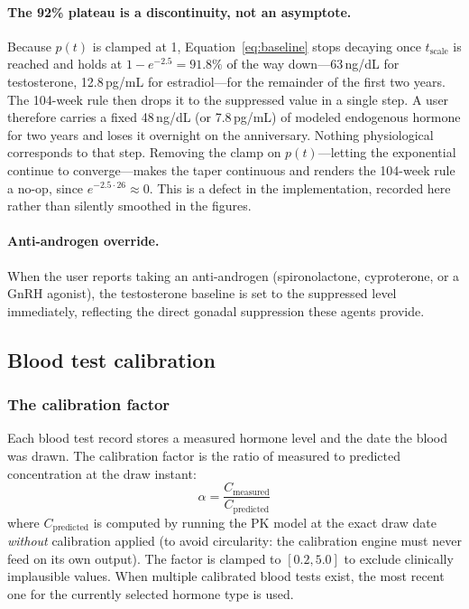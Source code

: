 \documentclass[11pt,a4paper]{article}
\begin{document}
\paragraph{The 92\% plateau is a discontinuity, not an asymptote.} Because
$p(t)$ is clamped at 1, Equation~\ref{eq:baseline} stops decaying once
$t_{\text{scale}}$ is reached and holds at $1 - e^{-2.5} = 91.8\%$ of the
way down---63\,ng/dL for testosterone, 12.8\,pg/mL for estradiol---for the
remainder of the first two years. The 104-week rule then drops it to the
suppressed value in a single step. A user therefore carries a fixed
48\,ng/dL (or 7.8\,pg/mL) of modeled endogenous hormone for two years and
loses it overnight on the anniversary. Nothing physiological corresponds to
that step. Removing the clamp on $p(t)$---letting the exponential continue
to converge---makes the taper continuous and renders the 104-week rule a
no-op, since $e^{-2.5 \cdot 26} \approx 0$. This is a defect in the
implementation, recorded here rather than silently smoothed in the figures.

\paragraph{Anti-androgen override.} When the user reports taking an
anti-androgen (spironolactone, cyproterone, or a GnRH agonist), the
testosterone baseline is set to the suppressed level immediately,
reflecting the direct gonadal suppression these agents provide.

\subsection{Blood test calibration}
\label{sec:calibration}

\subsubsection{The calibration factor}

Each blood test record stores a measured hormone level and the date the
blood was drawn. The calibration factor is the ratio of measured to
predicted concentration at the draw instant:
\begin{equation}
\alpha = \frac{C_{\text{measured}}}{C_{\text{predicted}}}
\label{eq:alpha}
\end{equation}
where $C_{\text{predicted}}$ is computed by running the PK model at the
exact draw date \emph{without} calibration applied (to avoid
circularity: the calibration engine must never feed on its own output).
The factor is clamped to $[0.2, 5.0]$ to exclude clinically implausible
values. When multiple calibrated blood tests exist, the most recent one
for the currently selected hormone type is used.
\end{document}
